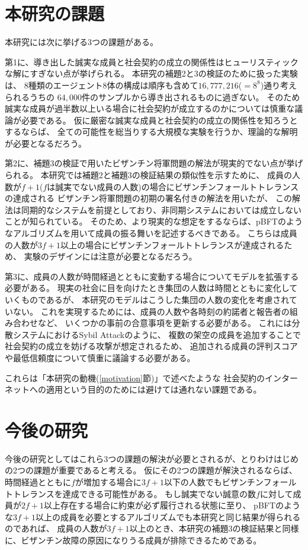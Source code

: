 \section{本研究の課題}
本研究には次に挙げる3つの課題がある。

第1に、導き出した誠実な成員と社会契約の成立の関係性はヒューリスティックな解にすぎない点が挙げられる。
本研究の補題2と3の検証のために扱った実験は、
8種類のエージェント8体の構成は順序も含めて$16,777,216$($=8^8$)通り考えられるうちの
$64,000$件のサンプルから導き出されるものに過ぎない。
そのため誠実な成員が過半数以上いる場合に社会契約が成立するのかについては慎重な議論が必要である。
仮に厳密な誠実な成員と社会契約の成立の関係性を知ろうとするならば、
全ての可能性を総当りする大規模な実験を行うか、理論的な解明が必要となるだろう。

第2に、補題3の検証で用いたビザンチン将軍問題の解法が現実的でない点が挙げられる。
本研究では補題2と補題3の検証結果の類似性を示すために、
成員の人数が$f+1$($f$は誠実でない成員の人数)の場合にビザンチンフォールトトレランスの達成される
ビザンチン将軍問題の初期の署名付きの解法\cite{lamport1982}を用いたが、
この解法は同期的なシステムを前提としており、非同期システムにおいては成立しないことが知られている。\cite{fischer1985}
そのため、より現実的な想定をするならば、pBFTのようなアルゴリズムを用いて成員の振る舞いを記述するべきである。\cite{castro1999}
こちらは成員の人数が$3f+1$以上の場合にビザンチンフォールトトレランスが達成されるため、
実験のデザインには注意が必要となるだろう。

第3に、成員の人数が時間経過とともに変動する場合についてモデルを拡張する必要がある。
現実の社会に目を向けたとき集団の人数は時間とともに変化していくものであるが、
本研究のモデルはこうした集団の人数の変化を考慮されていない。
これを実現するためには、成員の人数や各時刻の約諾者と報告者の組み合わせなど、
いくつかの事前の合意事項を更新する必要がある。
これには分散システムにおけるSybil Attack\cite{douceur2002}のように、
複数の架空の成員を追加することで社会契約の成立を妨げる攻撃が想定されるため、
追加される成員の評判スコアや最低信頼度について慎重に議論する必要がある。

これらは「本研究の動機(\ref{motivation}節)」で述べたような
社会契約のインターネットへの適用という目的のためには避けては通れない課題である。

\section{今後の研究}
今後の研究としてはこれら3つの課題の解決が必要とされるが、とりわけはじめの2つの課題が重要であると考える。
仮にその2つの課題が解決されるならば、
時間経過とともに$f$が増加する場合に$3f+1$以下の人数でもビザンチンフォールトトレランスを達成できる可能性がある。
もし誠実でない誠意の数$f$に対して成員が$2f+1$以上存在する場合に約束が必ず履行される状態に至り、
pBFT\cite{castro1999}のような$3f+1$以上の成員を必要とするアルゴリズムでも本研究と同じ結果が得られるのであれば、
成員の人数が$3f+1$以上のとき、本研究の補題3の検証結果と同様に、ビザンチン故障の原因になりうる成員が排除できるためである。

